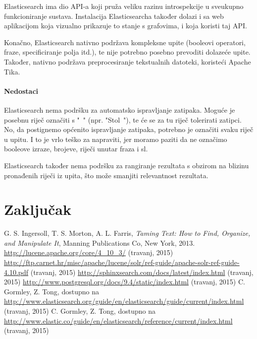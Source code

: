 \documentclass[a4paper,twoside,12pt]{scrreprt}
\begin{document}
Elasticsearch ima dio API-a koji pruža veliku razinu introspekcije u sveukupno funkcioniranje sustava. Instalacija Elasticsearcha također dolazi i sa web aplikacijom koja vizualno prikazuje to stanje s grafovima, i koja koristi taj API.

Konačno, Elasticsearch nativno podržava kompleksne upite (booleovi operatori, fraze, specificiranje polja itd.), te nije potrebno posebno prevoditi dolazeće upite. Također, nativno podržava preprocesiranje tekstualnih datoteki, koristeći Apache Tika.

\subsubsection{Nedostaci}

Elasticsearch nema podršku za automatsko ispravljanje zatipaka. Moguće je posebnu riječ označiti s "~" (npr. "Stol~"), te će se za tu riječ tolerirati zatipci. No, da postignemo općenito ispravljanje zatipaka, potrebno je označiti svaku riječ u upitu. I to je vrlo teško za napraviti, jer moramo paziti da ne označimo booleove izraze, brojeve, riječi unutar fraza i sl.

Elasticsearch također nema podršku za rangiranje rezultata s obzirom na blizinu pronađenih riječi iz upita, što može smanjiti relevantnost rezultata.

\chapter{Zaključak}

\begin{thebibliography}{99}
   G. S. Ingersoll, T. S. Morton, A. L. Farris, \textit{Taming Text: How to Find, Organize, and Manipulate It}, Manning Publications Co, New York, 2013.
   \url{http://lucene.apache.org/core/4_10_3/} (travanj, 2015)
   \url{http://ftp.carnet.hr/misc/apache/lucene/solr/ref-guide/apache-solr-ref-guide-4.10.pdf} (travanj, 2015)
   \url{http://sphinxsearch.com/docs/latest/index.html} (travanj, 2015)
   \url{http://www.postgresql.org/docs/9.4/static/index.html} (travanj, 2015)
   C. Gormley, Z. Tong, dostupno na \url{http://www.elasticsearch.org/guide/en/elasticsearch/guide/current/index.html} (travanj, 2015)
   C. Gormley, Z. Tong, dostupno na \url{http://www.elastic.co/guide/en/elasticsearch/reference/current/index.html} (travanj, 2015)
\end{thebibliography}

\pagestyle{empty}

\begin{sazetak}
\end{sazetak}

\begin{summary}
\end{summary}

\begin{cv}
\end{cv}
\end{document}
